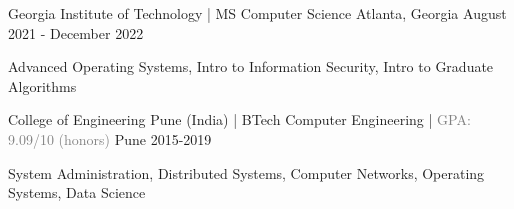 
\begin{cventries}
  \cventry
    {} %
    {Georgia Institute of Technology | MS Computer Science} %
    {Atlanta, Georgia} %
    {August 2021 - December 2022} %
    {
      \vspace{-0.8cm}
      \begin{cvitems} %
         \item {Advanced Operating Systems, Intro to Information Security, Intro to Graduate Algorithms \entrydatestyle{}}
      \end{cvitems}
    }
  \vspace{-0.2cm}
  \cventry
    {\textbf{}} %
    {College of Engineering Pune (India)  |  BTech Computer Engineering  | \textcolor{gray}{GPA: 9.09/10 (honors)}} %
    {Pune} %
    {2015-2019} %
    {
      \vspace{-0.8cm}
      \begin{cvitems} %
         \item {System Administration, Distributed Systems, Computer Networks, Operating Systems, Data Science \entrydatestyle{}}
      \end{cvitems}
    }
    \vspace{-0.5cm}
\end{cventries}